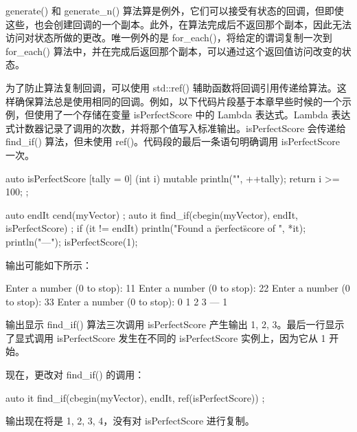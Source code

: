 generate() 和 generate\_n() 算法算是例外，它们可以接受有状态的回调，但即使这些，也会创建回调的一个副本。此外，在算法完成后不返回那个副本，因此无法访问对状态所做的更改。唯一例外的是 for\_each()，将给定的谓词复制一次到 for\_each() 算法中，并在完成后返回那个副本，可以通过这个返回值访问改变的状态。

为了防止算法复制回调，可以使用 std::ref() 辅助函数将回调引用传递给算法。这样确保算法总是使用相同的回调。例如，以下代码片段基于本章早些时候的一个示例，但使用了一个存储在变量 isPerfectScore 中的 Lambda 表达式。Lambda 表达式计数器记录了调用的次数，并将那个值写入标准输出。isPerfectScore 会传递给 find\_if() 算法，但未使用 ref()。代码段的最后一条语句明确调用 isPerfectScore 一次。

\begin{cpp}
auto isPerfectScore { [tally = 0] (int i) mutable {
        println("{}", ++tally); return i >= 100; } };

auto endIt { cend(myVector) };
auto it { find_if(cbegin(myVector), endIt, isPerfectScore) };
if (it != endIt) { println("Found a \"perfect\" score of {}", *it); }
println("---");
isPerfectScore(1);
\end{cpp}

输出可能如下所示：

\begin{shell}
Enter a number (0 to stop): 11
Enter a number (0 to stop): 22
Enter a number (0 to stop): 33
Enter a number (0 to stop): 0
1
2
3
---
1
\end{shell}

输出显示 find\_if() 算法三次调用 isPerfectScore 产生输出 1, 2, 3。最后一行显示了显式调用 isPerfectScore 发生在不同的 isPerfectScore 实例上，因为它从 1 开始。

现在，更改对 find\_if() 的调用：

\begin{cpp}
auto it { find_if(cbegin(myVector), endIt, ref(isPerfectScore)) };
\end{cpp}

输出现在将是 1, 2, 3, 4，没有对 isPerfectScore 进行复制。





